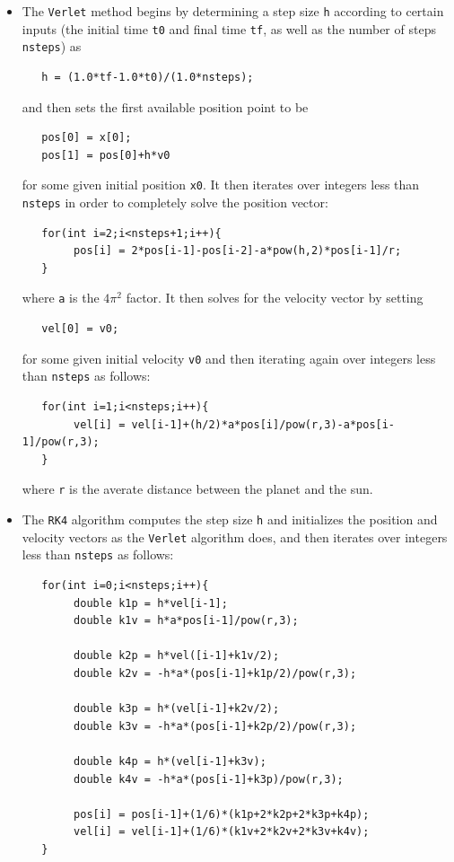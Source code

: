 \documentclass[12pt]{article}
\numberwithin{equation}{section}
\begin{document}
\begin{itemize}
\item The \texttt{Verlet} method begins by determining a step size \texttt{h} according to certain inputs (the initial time \texttt{t0} and final time \texttt{tf}, as well as the number of steps \texttt{nsteps}) as

\begin{verbatim}
   h = (1.0*tf-1.0*t0)/(1.0*nsteps);
\end{verbatim}

and then sets the first available position point to be

\begin{verbatim}
   pos[0] = x[0];
   pos[1] = pos[0]+h*v0
\end{verbatim}

for some given initial position \texttt{x0}.  It then iterates over integers less than \texttt{nsteps} in order to completely solve the position vector:

\begin{verbatim}
   for(int i=2;i<nsteps+1;i++){
        pos[i] = 2*pos[i-1]-pos[i-2]-a*pow(h,2)*pos[i-1]/r;
   }
\end{verbatim}

where \texttt{a} is the $4\pi^{2}$ factor.  It then solves for the velocity vector by setting

\begin{verbatim}
   vel[0] = v0;
\end{verbatim}

for some given initial velocity \texttt{v0} and then iterating again over integers less than \texttt{nsteps} as follows:

\begin{verbatim}
   for(int i=1;i<nsteps;i++){
        vel[i] = vel[i-1]+(h/2)*a*pos[i]/pow(r,3)-a*pos[i-1]/pow(r,3);
   }
\end{verbatim}

where \texttt{r} is the averate distance between the planet and the sun.
\item The \texttt{RK4} algorithm computes the step size \texttt{h} and initializes the position and velocity vectors as the \texttt{Verlet} algorithm does, and then iterates over integers less than \texttt{nsteps} as follows:

\begin{verbatim}
   for(int i=0;i<nsteps;i++){
        double k1p = h*vel[i-1];
        double k1v = h*a*pos[i-1]/pow(r,3);

        double k2p = h*vel([i-1]+k1v/2);
        double k2v = -h*a*(pos[i-1]+k1p/2)/pow(r,3);

        double k3p = h*(vel[i-1]+k2v/2);
        double k3v = -h*a*(pos[i-1]+k2p/2)/pow(r,3);

        double k4p = h*(vel[i-1]+k3v);
        double k4v = -h*a*(pos[i-1]+k3p)/pow(r,3);

        pos[i] = pos[i-1]+(1/6)*(k1p+2*k2p+2*k3p+k4p);
        vel[i] = vel[i-1]+(1/6)*(k1v+2*k2v+2*k3v+k4v);
   }
\end{verbatim}

\end{itemize}
\end{document}
